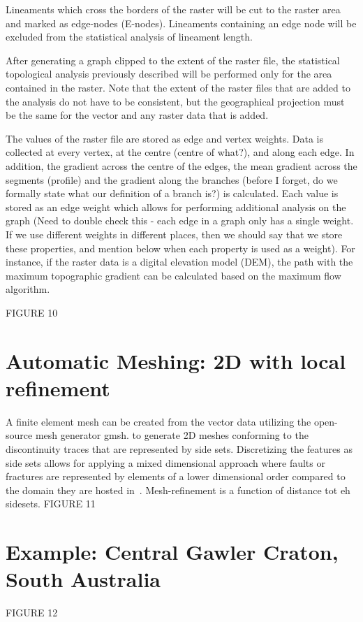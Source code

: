 \documentclass[a4paper,fleqn]{cas-sc}
\begin{document}
Lineaments which cross the borders of the raster will be cut to the raster area and marked as edge-nodes (E-nodes). Lineaments containing an edge node will be excluded from the statistical analysis of lineament length. 

After generating a graph clipped to the extent of the raster file, the statistical topological analysis previously described will be performed only for the area contained in the raster. Note that the extent of the raster files that are added to the analysis do not have to be consistent, but the geographical projection must be the same for the vector and any raster data that is added.

The values of the raster file are stored as edge and vertex weights. Data is collected at every vertex, at the centre (centre of what?), and along each edge. In addition, the gradient across the centre of the edges, the mean gradient across the segments (profile) and the gradient along the branches (before I forget, do we formally state what our definition of a branch is?) is calculated. Each value is stored as an edge weight which allows for performing additional analysis on the graph (Need to double check this - each edge in a graph only has a single weight. If we use different weights in different places, then we should say that we store these properties, and mention below when each property is used as a weight). For instance, if the raster data is a digital elevation model (DEM), the path with the maximum topographic gradient can be calculated based on the maximum flow algorithm. 

FIGURE 10

\section{Automatic Meshing: 2D with local refinement}
A finite element mesh can be created from the vector data utilizing the open-source mesh generator gmsh.
to generate 2D meshes conforming to the discontinuity traces that are represented by side sets. Discretizing the features as side sets allows for applying a mixed dimensional approach where faults or fractures are represented by elements of a lower dimensional order compared to the domain they are hosted in~\citep{Poulet2021}. Mesh-refinement is a function of distance tot eh sidesets. 
FIGURE 11
\section{Example: Central Gawler Craton, South Australia}
FIGURE 12
\end{document}
